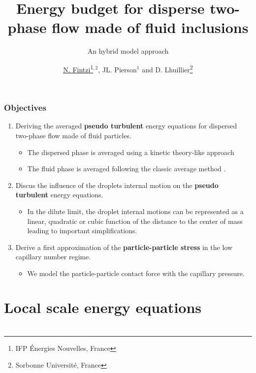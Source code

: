 \documentclass{sintefbeamer}
\title{Energy budget for disperse two-phase flow made of fluid inclusions}
\subtitle{An hybrid model approach}
\author{\href{http://basilisk.fr/sandbox/fintzin/Rising-Suspenion/RS.c}{\underline{N. Fintzi}\footnote{IFP \'Energies Nouvelles, France}$^{,2}$}, JL. Pierson$^1$ and D. Lhuillier\footnote{Sorbonne Universit\'e, France}}
\begin{document}
\maketitle
\section*{}
\section*{}

\begin{frame}
  \frametitle{Objectives}

  \begin{enumerate}
    \item Deriving the averaged \textbf{pseudo turbulent} energy equations for dispersed two-phase flow made of fluid particles. 
    \begin{itemize}
      \item The dispersed phase is averaged using a kinetic theory-like approach \citep{jackson1997locally,zhang1994averaged}
      \item The fluid phase is averaged following the classic average method \citep{drew1983mathematical}. 
    \end{itemize}
    \item Discus the influence of the droplets internal motion on the \textbf{pseudo turbulent} energy equations. 
    \begin{itemize}
      \item In the dilute limit, the droplet internal motions can be represented as a linear, quadratic or cubic function of the distance to the center of mass leading to important simplifications.
    \end{itemize}
    \item Derive a first approximation of the \textbf{particle-particle stress} in the low capillary number regime. 
    \begin{itemize}
      \item We model the particle-particle contact force with the capillary pressure. 
    \end{itemize}
  \end{enumerate}
\end{frame}
\section{Local scale energy equations}
\section*{}
\end{document}
